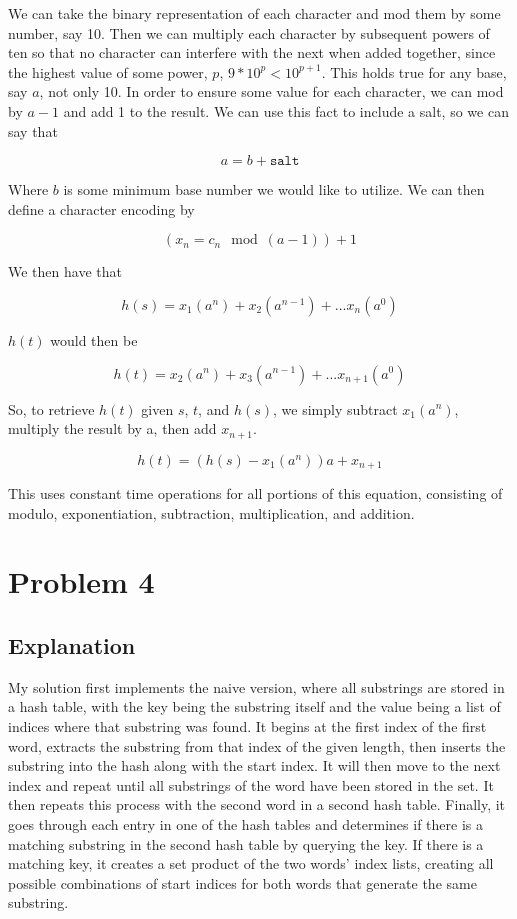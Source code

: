 \documentclass[answers, 12pt]{article}
\begin{document}
We can take the binary representation of each character and mod them by some number, say 10. Then we can multiply each character by subsequent powers of ten so that no character can interfere with the next when added together, since the highest value of some power, $p$, $9 * 10^p < 10^{p+1}$. This holds true for any base, say $a$, not only 10. In order to ensure some value for each character, we can mod by $a - 1$ and add 1 to the result. We can use this fact to include a salt, so we can say that 

\[
  a = b + \texttt{salt}
\]

Where $b$ is some minimum base number we would like to utilize. We can then define a character encoding by

\[
  (x_n = c_n \mod (a - 1)) + 1
\]

We then have that 

\[
  h(s) = x_1(a^n) + x_2(a^{n-1}) + ... x_n(a^0)
\] 

 $h(t)$ would then be 
 
 \[
  h(t) = x_2(a^{n}) + x_3(a^{n-1}) + ... x_{n+1}(a^0)
\]

So, to retrieve $h(t)$ given $s$, $t$, and $h(s)$, we simply subtract $x_1(a^n)$, multiply the result by a, then add $x_{n+1}$.

 \[
  h(t) = (h(s) - x_1(a^n))a + x_{n+1}
\]

This uses constant time operations for all portions of this equation, consisting of modulo, exponentiation, subtraction, multiplication, and addition.


\section*{Problem 4}
\subsection*{Explanation}
My solution first implements the naive version, where all substrings are stored in a hash table, with the key being the substring itself and the value being a list of indices where that substring was found. It begins at the first index of the first word, extracts the substring from that index of the given length, then inserts the substring into the hash along with the start index. It will then move to the next index and repeat until all substrings of the word have been stored in the set. It then repeats this process with the second word in a second hash table. Finally, it goes through each entry in one of the hash tables and determines if there is a matching substring in the second hash table by querying the key. If there is a matching key, it creates a set product of the two words' index lists, creating all possible combinations of start indices for both words that generate the same substring.
\end{document}
